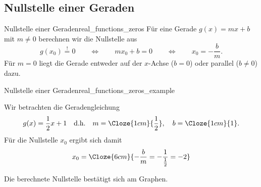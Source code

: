 \subsection{Nullstelle einer Geraden}
\label{subsec:real_functions_line_zero}
\begin{KeyPointBox}{Nullstelle einer Geraden}{real_functions_zeros}
  Für eine Gerade $g(x)=mx+b$ mit $m\ne0$ berechnen wir die Nullstelle aus
  \[
    g(x_0)\overset{!}{=}0
    \qquad \Longleftrightarrow \qquad
    mx_0+b=0
    \qquad \Longleftrightarrow \qquad
    x_0=-\frac{b}{m}.
  \]
  Für $m=0$ liegt die Gerade entweder auf der $x$-Achse ($b=0$) oder parallel ($b\ne0$) dazu.
\end{KeyPointBox}
\begin{ExampleBox}{Nullstelle einer Geraden}{real_functions_zeros_example}
  \begin{minipage}[c]{0.50\linewidth}
    Wir betrachten die Geradengleichung 
    \[
      g(x)=\frac12x+1 \quad \text{d.h.}\quad m=\Cloze{1cm}{\frac12},\quad b=\Cloze{1cm}{1}.
    \]
    Für die Nullstelle $x_0$ ergibt sich damit
    \[
      x_0=\Cloze{6cm}{-\frac{b}{m}=-\frac{1}{\frac12}=-2}
    \]
  \end{minipage}\hfill
  \begin{minipage}[c]{0.49\linewidth}
    \raggedleft
  \end{minipage}
  Die berechnete Nullstelle bestätigt sich am Graphen.
\end{ExampleBox}

